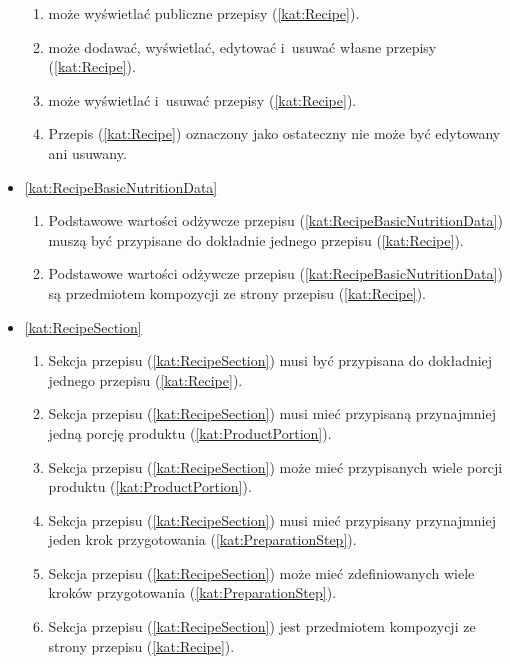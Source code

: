 \begin{itemize}[label={\textbf{Reguły dla}}, wide, labelwidth=!, labelindent=0pt]
\begin{enumerate}[label={\textbf{REG/3/\protect\twodigits{\arabic{enumi}}}}, wide, labelwidth=!, align=left, leftmargin=3cm]
        \item {} może wyświetlać publiczne przepisy (\ref{kat:Recipe}).
        \item {} może dodawać, wyświetlać, edytować i~usuwać własne przepisy (\ref{kat:Recipe}).
        \item {} może wyświetlać i~usuwać przepisy (\ref{kat:Recipe}).
        \item Przepis (\ref{kat:Recipe}) oznaczony jako ostateczny nie może być edytowany ani usuwany.
    \end{enumerate}
    \item\ref{kat:RecipeBasicNutritionData}\mynobreakpar
    \begin{enumerate}[label={\textbf{REG/3/\protect\twodigits{\arabic{enumi}}}}, wide, labelwidth=!, align=left, leftmargin=3cm, resume]
        \item Podstawowe wartości odżywcze przepisu (\ref{kat:RecipeBasicNutritionData}) muszą być przypisane do dokładnie jednego przepisu (\ref{kat:Recipe}).
        \item Podstawowe wartości odżywcze przepisu (\ref{kat:RecipeBasicNutritionData}) są przedmiotem kompozycji ze strony przepisu (\ref{kat:Recipe}).
    \end{enumerate}
    \item\ref{kat:RecipeSection}\mynobreakpar
    \begin{enumerate}[label={\textbf{REG/3/\protect\twodigits{\arabic{enumi}}}}, wide, labelwidth=!, align=left, leftmargin=3cm, resume]
        \item Sekcja przepisu (\ref{kat:RecipeSection}) musi być przypisana do dokładniej jednego przepisu (\ref{kat:Recipe}).
        \item Sekcja przepisu (\ref{kat:RecipeSection}) musi mieć przypisaną przynajmniej jedną porcję produktu (\ref{kat:ProductPortion}).
        \item Sekcja przepisu (\ref{kat:RecipeSection}) może mieć przypisanych wiele porcji produktu (\ref{kat:ProductPortion}).
        \item Sekcja przepisu (\ref{kat:RecipeSection}) musi mieć przypisany przynajmniej jeden krok przygotowania (\ref{kat:PreparationStep}).
        \item Sekcja przepisu (\ref{kat:RecipeSection}) może mieć zdefiniowanych wiele kroków przygotowania (\ref{kat:PreparationStep}).
        \item Sekcja przepisu (\ref{kat:RecipeSection}) jest przedmiotem kompozycji ze strony przepisu (\ref{kat:Recipe}).

\end{enumerate}
\end{itemize}
